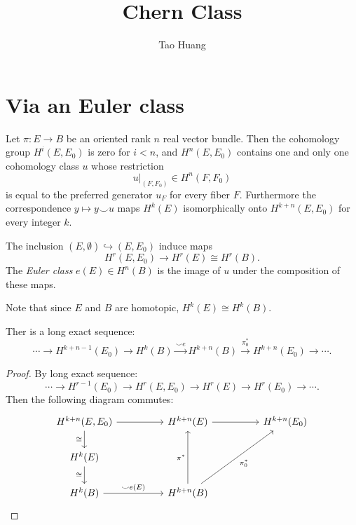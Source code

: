 \documentclass[11pt]{homework}
\title{Chern Class}
\author{Tao Huang}
\theoremstyle{indented}
\begin{document}
    
\maketitle


\section{Via an Euler class}
\begin{theorem}
    Let $\pi:E\to B$ be an oriented rank $n$ real vector bundle. Then the cohomology group $H^{i}\left(E, E_{0}\right)$ is zero for $i<n$, and $H^{n}\left(E, E_{0}\right)$ contains one and only one cohomology class $u$ whose restriction
    \begin{equation*}
        u \vert_{\left(F, F_{0}\right)} \in H^{n}\left(F, F_{0}\right)
    \end{equation*}
    is equal to the preferred generator $u_{F}$ for every fiber $F$. Furthermore the correspondence $y \mapsto y \smile u$ maps $H^{k}(E)$ isomorphically onto $H^{k+n}\left(E, E_{0}\right)$ for every integer $k$.
\end{theorem} 
\begin{definition}
    The inclusion $(E,\emptyset )\hookrightarrow (E, E_{0})$ induce maps
    \begin{equation*}
        H^{r}(E,E_{0})\to H^{r}(E) \cong H^{r}(B).
    \end{equation*}
    The \textit{Euler class} $e(E) \in H^n(B)$ is the image of $u$ under the composition of these maps.
\end{definition}
Note that since $E$ and $B$ are homotopic, $H^{k}(E) \cong H^{k}(B)$.
\begin{proposition}
    \label{prop:gysin}
    Ther is a long exact sequence:
    \begin{equation*}
        \cdots \to H^{k+n-1}(E_0) \to H^{k}(B) \xrightarrow{\smile e} H^{k+n}(B) \xrightarrow{\pi_0^*} H^{k+n}(E_0) \to \cdots.
    \end{equation*}
\end{proposition}
\begin{proof}
    By long exact sequence:
    \begin{equation*}
        \cdots \to H^{r-1}(E_0) \to H^{r}(E, E_0) \to H^{r}(E) \to H^{r}(E_0) \to \cdots.
    \end{equation*}
    Then the following diagram commutes:
    \[\begin{tikzcd}
        {H^{k+n}(E,E_0)} && {H^{k+n}(E)} && {H^{k+n}(E_0)} \\
        {H^k(E)} && {} \\
        {H^k(B)} && {H^{k+n}(B)}
        \arrow["{\pi_0^*}"', from=3-3, to=1-5]
        \arrow[from=1-3, to=1-5]
        \arrow["{\pi^*}", from=3-3, to=1-3]
        \arrow["{\smile e(E)}", from=3-1, to=3-3]
        \arrow[from=1-1, to=1-3]
        \arrow["\cong"', from=2-1, to=3-1]
        \arrow["\cong"', from=1-1, to=2-1]
    \end{tikzcd}\]
\end{proof}
\end{document}
